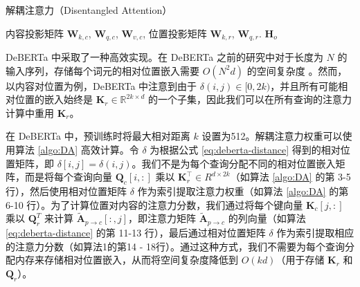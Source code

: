 \begin{algorithm}[htbp]
\caption{解耦注意力（Disentangled Attention）}
\label{algo:DA}
 \begin{algorithmic}[1]
    内容投影矩阵 $\mathbf{W}_{k,c}$, $\mathbf{W}_{q,c}$, $\mathbf{W}_{v,c}$,
    位置投影矩阵 $\mathbf{W}_{k,r}$, $\mathbf{W}_{q,r}$.
    \Ensure $\mathbf{H}_o$

    \EndFor
        \EndFor
    \EndFor
    \EndFor
        \EndFor
    \EndFor
 \end{algorithmic}

\end{algorithm}

DeBERTa 中采取了一种高效实现。在 DeBERTa 之前的研究中对于长度为 $N$ 的输入序列，存储每个词元的相对位置嵌入需要 $O(N^{2}d)$ 的空间复杂度 \cite{Shaw2018SelfAttentionWR, Huang2018MusicTG, Dai2019TransformerXLAL}。然而，以内容对位置为例，DeBERTa 中注意到由于 $\delta(i, j) \in [0, 2k)$，并且所有可能相对位置的嵌入始终是 $\mathbf{K}_{r} \in \mathbb{R}^{2k×d}$ 的一个子集，因此我们可以在所有查询的注意力计算中重用 $\mathbf{K}_{r}$。

在 DeBERTa 中，预训练时将最大相对距离 $k$ 设置为512。解耦注意力权重可以使用算法 \ref{algo:DA} 高效计算。令 $\delta$ 为根据公式 \ref{eq:deberta-distance} 得到的相对位置矩阵，即 $\delta[i, j] = \delta(i, j)$。我们不是为每个查询分配不同的相对位置嵌入矩阵，而是将每个查询向量 $\mathbf{Q}_{c}[i, :]$ 乘以 $\mathbf{K}_{r}^{\intercal} \in R^{d×2k}$（如算法 \ref{algo:DA} 的第 3-5 行），然后使用相对位置矩阵 $\delta$ 作为索引提取注意力权重（如算法 \ref{algo:DA} 的第 6-10 行）。为了计算位置对内容的注意力分数，我们通过将每个键向量 $\mathbf{K}_{c}[j, :]$ 乘以 $\mathbf{Q}_{r}^{T}$ 来计算 $\tilde{\mathbf{A}}_{p \to c}[:, j]$，即注意力矩阵 $\tilde{\mathbf{A}}_{p \to c}$ 的列向量（如算法 \ref{eq:deberta-distance} 的第 11-13 行），最后通过相对位置矩阵 $\delta$ 作为索引提取相应的注意力分数（如算法1的第14 - 18行）。通过这种方式，我们不需要为每个查询分配内存来存储相对位置嵌入，从而将空间复杂度降低到 $O(kd)$（用于存储 $\mathbf{K}_{r}$ 和 $\mathbf{Q}_{r}$）。 

